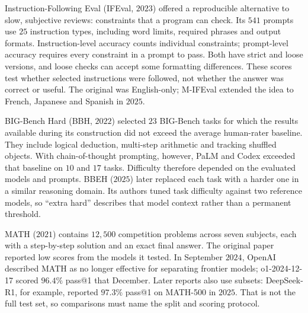 
Instruction-Following Eval (IFEval, $2023$) offered a reproducible alternative to slow, subjective reviews: constraints that a program can
check. Its $541$ prompts use $25$ instruction types, including word limits, required phrases and output formats. Instruction-level accuracy counts individual
constraints; prompt-level accuracy requires every constraint in a prompt to pass. Both have strict and loose versions, and loose checks
can accept some formatting differences. These scores test whether selected instructions were followed, not whether the answer was
correct or useful. The original was English-only; M-IFEval extended the idea to French, Japanese and Spanish in $2025$.

\newpage
{}

BIG-Bench Hard (BBH, $2022$) selected $23$ BIG-Bench tasks for which the results available during its construction did not exceed the
average human-rater baseline. They include logical deduction, multi-step arithmetic and tracking shuffled objects. With chain-of-thought
prompting, however, PaLM and Codex exceeded that baseline on $10$ and $17$ tasks. Difficulty therefore depended on the evaluated models
and prompts. BBEH ($2025$) later replaced each task with a harder one in a similar reasoning domain. Its authors tuned task difficulty
against two reference models, so ``extra hard'' describes that model context rather than a permanent threshold.


MATH ($2021$) contains $12{,}500$ competition problems across seven subjects, each with a step-by-step solution and an exact final answer.
The original paper reported low scores from the models it tested. In September $2024$, OpenAI described MATH as no longer effective for
separating frontier models; o1-2024-12-17 scored $96.4\%$ pass@1 that December. Later reports also use subsets: DeepSeek-R1, for example, reported
$97.3\%$ pass@1 on MATH-500 in $2025$. That is not the full test set, so comparisons must name the split and scoring protocol.



